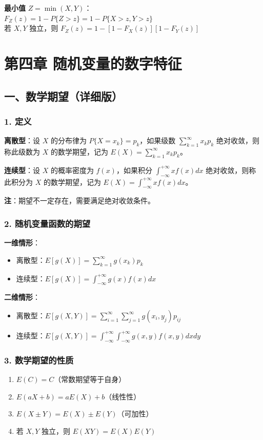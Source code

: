 \documentclass[12pt,a4paper]{ctexart}
\begin{document}
\textbf{最小值} $Z = \min(X, Y)$：\\
$F_Z(z) = 1 - P\{Z > z\} = 1 - P\{X > z, Y > z\}$\\
若 $X, Y$ 独立，则 $F_Z(z) = 1 - [1 - F_X(z)][1 - F_Y(z)]$

\newpage
\section{第四章 随机变量的数字特征}

\subsection{一、数学期望（详细版）}

\subsubsection{1. 定义}
\textbf{离散型}：设 $X$ 的分布律为 $P\{X = x_k\} = p_k$，如果级数 $\sum_{k=1}^\infty x_k p_k$ 绝对收敛，则称此级数为 $X$ 的数学期望，记为 $E(X) = \sum_{k=1}^\infty x_k p_k$。

\textbf{连续型}：设 $X$ 的概率密度为 $f(x)$，如果积分 $\int_{-\infty}^{+\infty} x f(x) dx$ 绝对收敛，则称此积分为 $X$ 的数学期望，记为 $E(X) = \int_{-\infty}^{+\infty} x f(x) dx$。

\textbf{注}：期望不一定存在，需要满足绝对收敛条件。

\subsubsection{2. 随机变量函数的期望}
\textbf{一维情形}：
\begin{itemize}[noitemsep]
    \item 离散型：$E[g(X)] = \sum_{k=1}^\infty g(x_k) p_k$
    \item 连续型：$E[g(X)] = \int_{-\infty}^{+\infty} g(x) f(x) dx$
\end{itemize}

\textbf{二维情形}：
\begin{itemize}[noitemsep]
    \item 离散型：$E[g(X, Y)] = \sum_{i=1}^\infty \sum_{j=1}^\infty g(x_i, y_j) p_{ij}$
    \item 连续型：$E[g(X, Y)] = \int_{-\infty}^{+\infty} \int_{-\infty}^{+\infty} g(x, y) f(x, y) dx dy$
\end{itemize}

\subsubsection{3. 数学期望的性质}
\begin{enumerate}[noitemsep]
    \item $E(C) = C$（常数期望等于自身）
    \item $E(aX + b) = aE(X) + b$（线性性）
    \item $E(X \pm Y) = E(X) \pm E(Y)$（可加性）
    \item 若 $X, Y$ 独立，则 $E(XY) = E(X)E(Y)$
\end{enumerate}
\end{document}
